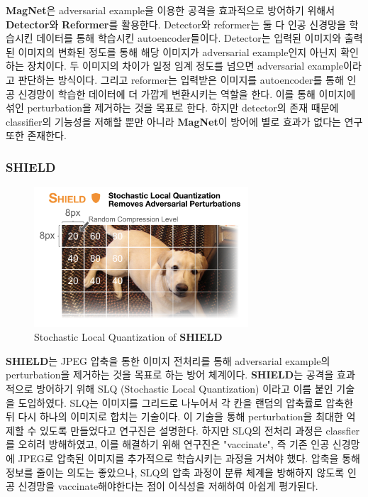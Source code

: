 \documentclass{article}
\begin{document}
\textbf{MagNet}은 adversarial example을 이용한 공격을 효과적으로 방어하기 위해서 \textbf{Detector}와 \textbf{Reformer}를 활용한다.\cite{carlini2017magnet} Detector와 reformer는 둘 다 인공 신경망을 학습시킨 데이터를 통해 학습시킨 autoencoder들이다. Detector는 입력된 이미지와 출력된 이미지의 변화된 정도를 통해 해당 이미지가 adversarial example인지 아닌지 확인하는 장치이다. 두 이미지의 차이가 일정 임계 정도를 넘으면 adversarial example이라고 판단하는 방식이다. 그리고 reformer는 입력받은 이미지를 autoencoder를 통해 인공 신경망이 학습한 데이터에 더 가깝게 변환시키는 역할을 한다. 이를 통해 이미지에 섞인 perturbation을 제거하는 것을 목표로 한다. 하지만 detector의 존재 때문에 classifier의 기능성을 저해할 뿐만 아니라 \textbf{MagNet}이 방어에 별로 효과가 없다는 연구\cite{carlini2017magnet} 또한 존재한다.

\subsubsection{SHIELD}

\begin{figure}[h]
    \centering
    \includegraphics[width=8cm]{images/shield-example.png}
    \caption{Stochastic Local Quantization of \textbf{SHIELD} \cite{das2018shield}}
\end{figure}

\textbf{SHIELD}는 JPEG 압축을 통한 이미지 전처리를 통해 adversarial example의 perturbation을 제거하는 것을 목표로 하는 방어 체계이다.\cite{das2018shield} \textbf{SHIELD}는 공격을 효과적으로 방어하기 위해 SLQ (Stochastic Local Quantization) 이라고 이름 붙인 기술을 도입하였다. SLQ는 이미지를 그리드로 나누어서 각 칸을 랜덤의 압축률로 압축한 뒤 다시 하나의 이미지로 합치는 기술이다. 이 기술을 통해 perturbation을 최대한 억제할 수 있도록 만들었다고 연구진은 설명한다. 하지만 SLQ의 전처리 과정은 classfier를 오히려 방해하였고, 이를 해결하기 위해 연구진은 "vaccinate", 즉 기존 인공 신경망에 JPEG로 압축된 이미지를 추가적으로 학습시키는 과정을 거쳐야 했다. 압축을 통해 정보를 줄이는 의도는 좋았으나, SLQ의 압축 과정이 분류 체계을 방해하지 않도록 인공 신경망을 vaccinate해야한다는 점이 이식성을 저해하여 아쉽게 평가된다.
\end{document}
